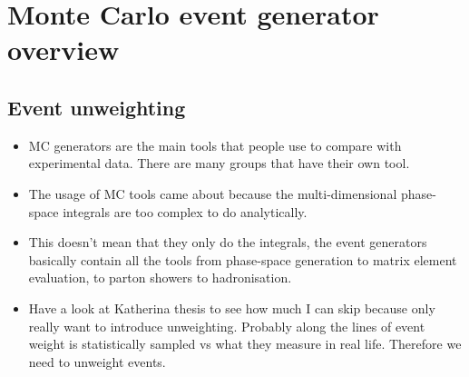 \documentclass[main.tex]{subfiles}
\begin{document}
\section{Monte Carlo event generator overview}
\subsection{Event unweighting}
\begin{itemize}
    \item MC generators are the main tools that
    people use to compare with experimental data.
    There are many groups that have their own tool.
    \item The usage of MC tools came about because
    the multi-dimensional phase-space integrals
    are too complex to do analytically.
    \item This doesn't mean that they only do
    the integrals, the event generators basically
    contain all the tools from phase-space generation
    to matrix element evaluation, to parton showers
    to hadronisation.
    \item Have a look at Katherina thesis to see
    how much I can skip because only really want to
    introduce unweighting. Probably along the lines
    of event weight is statistically sampled vs
    what they measure in real life. Therefore we need
    to unweight events.
\end{itemize}
\end{document}
